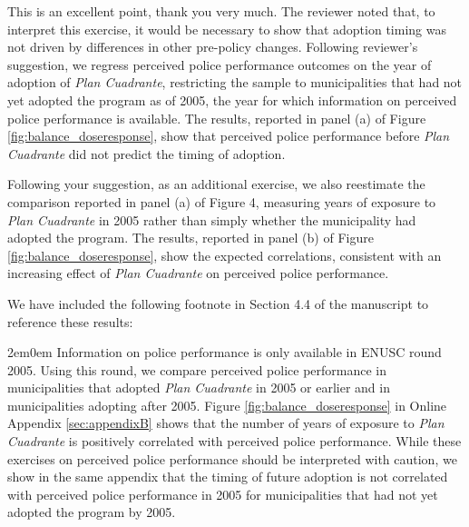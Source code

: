 
This is an excellent point, thank you very much. The reviewer noted that, to interpret this exercise, it would be necessary to show that adoption timing was not driven by differences in other pre-policy changes. Following reviewer's suggestion, we regress perceived police performance outcomes on the year of adoption of \emph{Plan Cuadrante}, restricting the sample to municipalities that had not yet adopted the program as of 2005, the year for which information on perceived police performance is available. The results, reported in panel (a) of Figure \ref{fig:balance_doseresponse}, show that perceived police performance before \emph{Plan Cuadrante} did not predict the timing of adoption.


Following your suggestion, as an additional exercise, we also reestimate the comparison reported in panel (a) of Figure 4, measuring years of exposure to \emph{Plan Cuadrante} in 2005 rather than simply whether the municipality had adopted the program. The results, reported in panel (b) of Figure \ref{fig:balance_doseresponse}, show the expected correlations, consistent with an increasing effect of \emph{Plan Cuadrante} on perceived police performance.

We have included the following footnote in Section 4.4 of the manuscript to reference these results:

\begin{adjustwidth}{2em}{0em}
Information on police performance is only available in ENUSC round 2005. Using this round, we compare perceived police performance in municipalities that adopted \emph{Plan Cuadrante} in 2005 or earlier and in municipalities adopting after 2005. Figure \ref{fig:balance_doseresponse} in Online Appendix \ref{sec:appendixB} shows that the number of years of exposure to \emph{Plan Cuadrante} is positively correlated with perceived police performance. While these exercises on perceived police performance should be interpreted with caution, we show in the same appendix that the timing of future adoption is not correlated with perceived police performance in 2005 for municipalities that had not yet adopted the program by 2005.
\end{adjustwidth}

